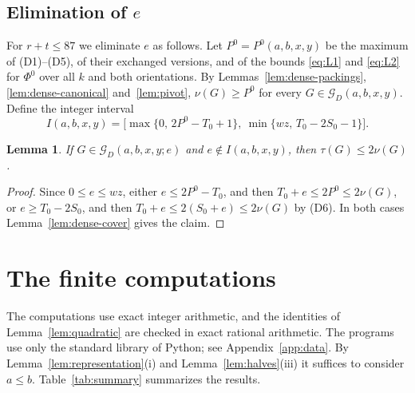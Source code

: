 \documentclass{amsart}
\newtheorem{lemma}[theorem]{Lemma}
\theoremstyle{definition}
\numberwithin{equation}{section}
\numberwithin{table}{section}
\begin{document}
\subsection{Elimination of \texorpdfstring{$e$}{e}}
For $r+t\le 87$ we eliminate $e$ as follows. Let $P^0=P^0(a,b,x,y)$ be the maximum of (D1)--(D5), of their exchanged versions, and of the bounds \eqref{eq:L1} and \eqref{eq:L2} for $\Phi^0$ over all $k$ and both orientations. By Lemmas~\ref{lem:dense-packings}, \ref{lem:dense-canonical} and~\ref{lem:pivot}, $\nu(G)\ge P^0$ for every $G\in\mathcal G_D(a,b,x,y)$. Define the integer interval
\begin{equation}\label{eq:interval}
I(a,b,x,y)=\bigl[\max\{0,\,2P^0-T_0+1\},\ \min\{wz,\,T_0-2S_0-1\}\bigr].
\end{equation}

\begin{lemma}\label{lem:interval}
If $G\in\mathcal G_D(a,b,x,y;e)$ and $e\notin I(a,b,x,y)$, then $\tau(G)\le 2\nu(G)$.
\end{lemma}

\begin{proof}
Since $0\le e\le wz$, either $e\le 2P^0-T_0$, and then $T_0+e\le 2P^0\le 2\nu(G)$, or $e\ge T_0-2S_0$, and then $T_0+e\le 2(S_0+e)\le 2\nu(G)$ by (D6). In both cases Lemma~\ref{lem:dense-cover} gives the claim.
\end{proof}

\section{The finite computations}\label{sec:computations}

The computations use exact integer arithmetic, and the identities of Lemma~\ref{lem:quadratic} are checked in exact rational arithmetic. The programs use only the standard library of Python; see Appendix~\ref{app:data}. By Lemma~\ref{lem:representation}(i) and Lemma~\ref{lem:halves}(iii) it suffices to consider $a\le b$. Table~\ref{tab:summary} summarizes the results.
\end{document}
